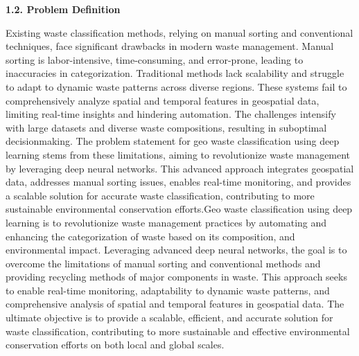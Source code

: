 \documentclass[12pt, English]{article}
\begin{document}
\begin{large}
\textbf{1.2. Problem Definition}
\end{large}
\begin{normalsize}
    
Existing waste classification methods, relying on manual sorting and conventional techniques, face significant drawbacks in modern waste management. Manual sorting is labor-intensive, time-consuming, and error-prone, leading to inaccuracies in categorization. Traditional methods lack scalability and struggle to adapt to dynamic waste patterns across diverse regions. These systems fail to comprehensively analyze spatial and temporal features in geospatial data, limiting real-time insights and hindering automation. The challenges intensify with large datasets and diverse waste compositions, resulting in suboptimal decisionmaking. The problem statement for geo waste classification using deep learning stems from these limitations, aiming to revolutionize waste management by
leveraging deep neural networks. This advanced approach integrates geospatial data, addresses manual sorting issues, enables real-time monitoring, and provides a scalable solution for accurate waste classification, contributing to more sustainable environmental conservation efforts.Geo waste classification using deep learning is to revolutionize waste management practices by automating and enhancing the categorization of waste based on its composition, and environmental impact. Leveraging advanced deep neural networks, the goal is to overcome the limitations of manual sorting and conventional methods and providing recycling methods of major components in waste. This approach seeks to enable real-time monitoring, adaptability to dynamic waste patterns, and comprehensive analysis of spatial and temporal features in geospatial data. The ultimate objective is to provide a scalable, efficient, and accurate solution for waste classification, contributing to more sustainable and effective environmental conservation efforts on both local and global scales.

\end{normalsize}
\end{document}
